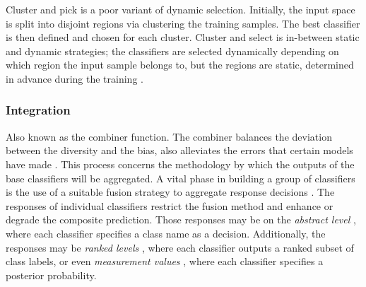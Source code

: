 Cluster and pick \cite{kuncheva2000} is a poor variant of dynamic selection. Initially, the input space is split into disjoint regions via clustering the training samples. The best classifier is then defined and chosen for each cluster. Cluster and select is in-between static and dynamic strategies; the classifiers are selected dynamically depending on which region the input sample belongs to, but the regions are static, determined in advance during the training \cite{ruta2005}.

 
 
 
\subsubsection{Integration}
Also known as the combiner function. The combiner balances the deviation between the diversity and the bias, also alleviates the errors that certain models have made \cite{SOARES2013}. This process concerns the methodology by which the outputs of the base classifiers will be aggregated.  A vital phase in building a group of classifiers is the use of a suitable fusion strategy to aggregate response decisions \cite{zhou2012,kuncheva2014}. The responses of individual classifiers restrict the fusion method and enhance or degrade the composite prediction. Those responses may be on the \textit{abstract level} \cite{xu1992}, where each classifier specifies a class name as a decision. Additionally, the responses may be \textit{ranked levels} \cite{PARKER2001}, where each classifier outputs a ranked subset of class labels, or even  \textit{measurement values} \cite{kuncheva2014a,niu2007}, where each classifier specifies a posterior probability.



